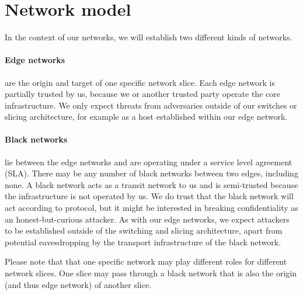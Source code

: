 \section{Network model}
In the context of our networks, we will establish two different kinds of networks.
\paragraph{Edge networks}
are the origin and target of one specific network slice. Each edge network is partially trusted by us, because we or another trusted party operate the core infrastructure. We only expect threats from adversaries outside of our switches or slicing architecture, for example as a host established within our edge network.
\paragraph{Black networks}
lie between the edge networks and are operating under a service level agreement (SLA). There may be any number of black networks between two edges, including none. A black network acts as a transit network to us and is semi-trusted because the infrastructure is not operated by us. We do trust that the black network will act according to protocol, but it might be interested in breaking confidentiality as an honest-but-curious attacker. As with our edge networks, we expect attackers to be established outside of the switching and slicing architecture, apart from potential eavesdropping by the transport infrastructure of the black network.

Please note that that one specific network may play different roles for different network slices. One slice may pass through a black network that is also the origin (and thus edge network) of another slice.


